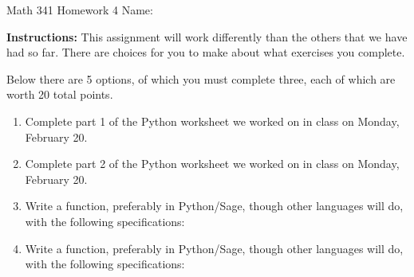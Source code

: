 \documentclass[12pt]{article}
\begin{document}
	Math 341 Homework 4
	\hfill
	Name: \underline{\hspace*{2in}}
	
	\textbf{Instructions:} This assignment will work differently than the others that we have had so far. There are choices for you to make about what exercises you complete.
	
	Below there are 5 options, of which you must complete three, each of which are worth 20 total points.
\begin{enumerate}
	\item Complete part 1 of the Python worksheet we worked on in class on Monday, February 20.
	\item Complete part 2 of the Python worksheet we worked on in class on Monday, February 20.
	\item Write a function, preferably in Python/Sage, though other languages will do, with the following specifications:
	
	
	\item Write a function, preferably in Python/Sage, though other languages will do, with the following specifications:
	
	
	
\end{enumerate}
		
\end{document}
